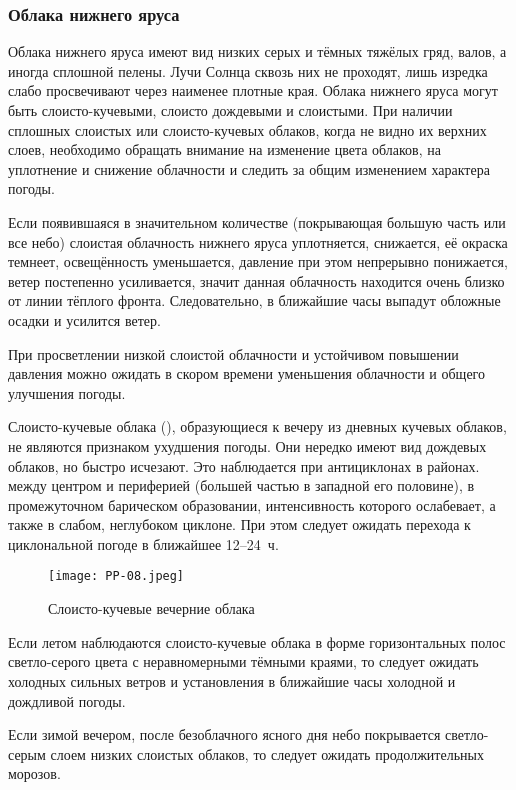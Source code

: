 \subsubsection{Облака нижнего яруса}

Облака нижнего яруса имеют вид низких серых и тёмных тяжёлых гряд,
валов, а иногда сплошной пелены. Лучи Солнца сквозь них не проходят,
лишь изредка слабо просвечивают через наименее плотные края. Облака
нижнего яруса могут быть слоисто-кучевыми, слоисто дождевыми и
слоистыми. При наличии сплошных слоистых или слоисто-кучевых облаков,
когда не видно их верхних слоев, необходимо обращать внимание на
изменение цвета облаков, на уплотнение и снижение облачности и следить
за общим изменением характера погоды.

 Если появившаяся в значительном количестве (покрывающая большую
часть или все небо) слоистая облачность нижнего яруса уплотняется,
снижается, её окраска темнеет, освещённость уменьшается, давление при
этом непрерывно понижается, ветер постепенно усиливается, значит
данная облачность находится очень близко от линии тёплого
фронта. Следовательно, в ближайшие часы выпадут обложные осадки и
усилится ветер.

 При просветлении низкой слоистой облачности и устойчивом
повышении давления можно ожидать в скором времени уменьшения
облачности и общего улучшения погоды.

 Слоисто-кучевые облака (), образующиеся к вечеру из
дневных кучевых облаков, не являются признаком ухудшения погоды. Они
нередко имеют вид дождевых облаков, но быстро исчезают. Это
наблюдается при антициклонах в районах. между центром и периферией
(большей частью в западной его половине), в промежуточном барическом
образовании, интенсивность которого ослабевает, а также в слабом,
неглубоком циклоне. При этом следует ожидать перехода к циклональной
погоде в ближайшее 12--24~ч.

\begin{figure}[htb]
  \centering{}
  \texttt{[image: PP-08.jpeg]}
  \caption{Слоисто-кучевые вечерние облака}
  \label{fig:pp08}
  \small
  \centering{}
\end{figure}

 Если летом наблюдаются слоисто-кучевые облака в форме
горизонтальных полос светло-серого цвета с неравномерными тёмными
краями, то следует ожидать холодных сильных ветров и установления в
ближайшие часы холодной и дождливой погоды.

 Если зимой вечером, после безоблачного ясного дня небо
покрывается светло-серым слоем низких слоистых облаков, то следует
ожидать продолжительных морозов.

